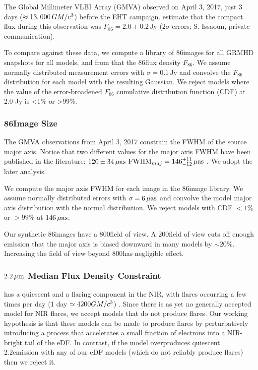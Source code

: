 The Global Millimeter VLBI Array (GMVA) observed \sgra on April 3, 2017, just 3 days ($\approx 13,000 \,GM/c^3$) before the EHT campaign.
\citet{2019ApJ...871...30I} estimate that the compact flux during this observation was $F_{86} = 2.0 \pm 0.2\,\mathrm{Jy}$ ($2\sigma$ errors; S. Issaoun, private communication).

To compare against these data, we compute a library of 86\GHz images for all GRMHD snapshots for all models, and from that the 86\GHz flux density $F_{86}$.  We assume normally distributed measurement errors with $\sigma = 0.1\,\mathrm{Jy}$ and convolve the $F_{86}$ distribution for each model with the resulting Gaussian.  We reject models where the value of the error-broadened $F_{86}$ cumulative distribution function (CDF) at 2.0 Jy is <1\% or >99\%.

\subsubsection{86\GHz Image Size}\label{sec:86size}

The GMVA observations from April 3, 2017 constrain the FWHM of the source major axis.  Notice that two different values for the major axis FWHM have been published in the literature: $120 \pm 34\,\mathrm{\mu as}$ \citep{2019ApJ...871...30I}
${\rm FWHM}_{maj} = 146^{+11}_{-12}\,\mathrm{\mu as}$ \citep[95\% confidence][]{2021ApJ...915...99I}.  We adopt the later analysis.

We compute the major axis FWHM for each image in the 86\GHz image library.  We assume normally distributed errors with $\sigma = 6\,\mathrm{\mu as}$ and convolve the model major axis distribution with the normal distribution.  We reject models with CDF $< 1\%$ or $> 99\%$ at $146\,\mathrm{\mu as}$.

Our synthetic 86\GHz images have a 800\uas field of view.  A 200\uas field of view cuts off enough emission that the major axis is biased downward in many models by $\sim 20\%$.  Increasing the field of view beyond 800\uas has negligible effect.

\subsubsection{$2.2\,\mu\mathrm{m}$ Median Flux Density Constraint}\label{subsec:nir}

\sgra has a quiescent and a flaring component in the NIR, with flares occurring a few times per day
(1 day $\simeq 4200 GM/c^3$) \citep{2018ApJ...863...15W}.  Since there is as yet no generally accepted model for NIR flares, we accept models that do not produce flares.  Our working hypothesis is that these models can be made to produce flares by perturbatively introducing a process that accelerates a small fraction of electrons into a  NIR-bright tail of the eDF.  In contrast, if the model overproduces quiescent 2.2\um emission with any of our eDF models (which do not reliably produce flares) then we reject it.

